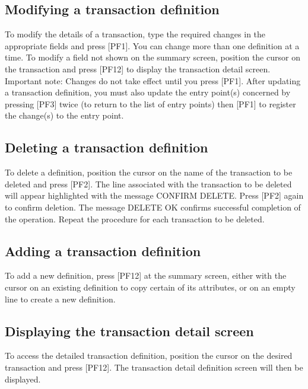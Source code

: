 \documentclass[letterpaper,10pt,english]{sphinxmanual}
\begin{document}
\subsection{Modifying a transaction definition}
\label{\detokenize{connectivity_guide:modifying-a-transaction-definition}}
To modify the details of a transaction, type the required changes in the appropriate fields and press {[}PF1{]}. You can change more than one definition at a time. To modify a field not shown on the summary screen, position the cursor on the transaction and press {[}PF12{]} to display the transaction detail screen. Important note: Changes do not take effect until you press {[}PF1{]}. After updating a transaction definition, you must also update the entry point(s) concerned by pressing {[}PF3{]} twice (to return to the list of entry points) then {[}PF1{]} to register the change(s) to the entry point.


\subsection{Deleting a transaction definition}
\label{\detokenize{connectivity_guide:deleting-a-transaction-definition}}
To delete a definition, position the cursor on the name of the transaction to be deleted and press {[}PF2{]}. The line associated with the transaction to be deleted will appear highlighted with the message CONFIRM DELETE. Press {[}PF2{]} again to confirm deletion. The message DELETE OK confirms successful completion of the operation. Repeat the procedure for each transaction to be deleted.


\subsection{Adding a transaction definition}
\label{\detokenize{connectivity_guide:adding-a-transaction-definition}}
To add a new definition, press {[}PF12{]} at the summary screen, either with the cursor on an existing definition to copy certain of its attributes, or on an empty line to create a new definition.


\subsection{Displaying the transaction detail screen}
\label{\detokenize{connectivity_guide:displaying-the-transaction-detail-screen}}
To access the detailed transaction definition, position the cursor on the desired transaction and press {[}PF12{]}. The transaction detail definition screen will then be displayed.
\end{document}
